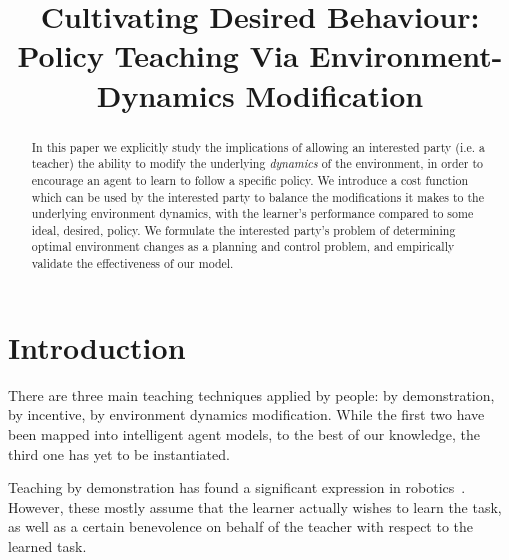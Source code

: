 \documentclass[letterpaper]{aamas2010}
\title{Cultivating Desired Behaviour: Policy Teaching Via Environment-Dynamics Modification }
\begin{document}
\maketitle

\begin{abstract}

In this paper we explicitly study the implications of allowing an interested party (i.e. a teacher) the ability to modify the underlying \emph{dynamics} of the environment, in order to encourage an agent to learn to follow a specific policy. 
We introduce a cost function which can be used by the interested party to balance the modifications it makes to the underlying environment dynamics, with the learner's performance compared to some ideal, desired, policy. We formulate the interested party's problem of determining optimal environment changes as a planning and control problem, and empirically validate the effectiveness of our model.
\end{abstract}

\section{Introduction}

There are three main teaching techniques applied by people: by
demonstration, by incentive, by environment dynamics
modification. While the
first two have been mapped into intelligent agent models, to the best
of our knowledge, the third one has yet to be instantiated.

Teaching by demonstration has found a significant expression in
robotics~\cite{argal_etal_2009}. However, these mostly assume that the
learner actually wishes to learn the task, as well as a certain
benevolence on behalf of the teacher with respect to the learned
task.
\end{document}
